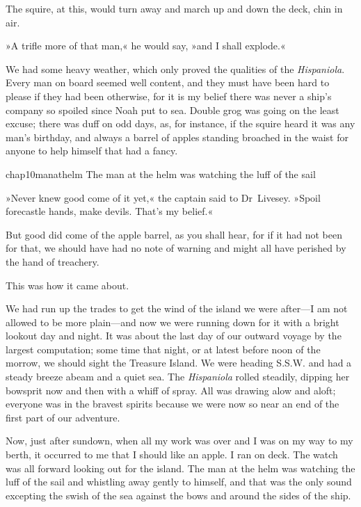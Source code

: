 The squire, at this, would turn away and march up and down the deck, chin in air.

»A trifle more of that man,« he would say, »and I shall explode.«

We had some heavy weather, which only proved the qualities of the \textit{Hispaniola}. Every man on board seemed well content, and they must have been hard to please if they had been otherwise, for it is my belief there was never a ship's company so spoiled since Noah put to sea. Double grog was going on the least excuse; there was duff on odd days, as, for instance, if the squire heard it was any man's birthday, and always a barrel of apples standing broached in the waist for anyone to help himself that had a fancy.


\begin{bwbigpic}
	[\picsize]
	{chap10manathelm}
	{The man at the helm was watching the luff of the sail}
\end{bwbigpic}

»Never knew good come of it yet,« the captain said to Dr~Livesey. »Spoil forecastle hands, make devils. That's my belief.«

But good did come of the apple barrel, as you shall hear, for if it had not been for that, we should have had no note of warning and might all have perished by the hand of treachery.

This was how it came about.

We had run up the trades to get the wind of the island we were after—I am not allowed to be more plain—and now we were running down for it with a bright lookout day and night. It was about the last day of our outward voyage by the largest computation; some time that night, or at latest before noon of the morrow, we should sight the Treasure Island. We were heading S.S.W. and had a steady breeze abeam and a quiet sea. The \textit{Hispaniola} rolled steadily, dipping her bowsprit now and then with a whiff of spray. All was drawing alow and aloft; everyone was in the bravest spirits because we were now so near an end of the first part of our adventure.

Now, just after sundown, when all my work was over and I was on my way to my berth, it occurred to me that I should like an apple. I ran on deck. The watch was all forward looking out for the island. The man at the helm was watching the luff of the sail and whistling away gently to himself, and that was the only sound excepting the swish of the sea against the bows and around the sides of the ship.




